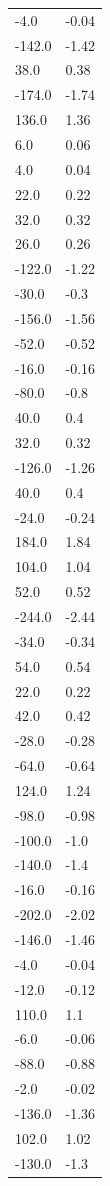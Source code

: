\begin{longtable}{ll}
-4.0 & -0.04 \\
-142.0 & -1.42 \\
38.0 & 0.38 \\
-174.0 & -1.74 \\
136.0 & 1.36 \\
6.0 & 0.06 \\
4.0 & 0.04 \\
22.0 & 0.22 \\
32.0 & 0.32 \\
26.0 & 0.26 \\
-122.0 & -1.22 \\
-30.0 & -0.3 \\
-156.0 & -1.56 \\
-52.0 & -0.52 \\
-16.0 & -0.16 \\
-80.0 & -0.8 \\
40.0 & 0.4 \\
32.0 & 0.32 \\
-126.0 & -1.26 \\
40.0 & 0.4 \\
-24.0 & -0.24 \\
184.0 & 1.84 \\
104.0 & 1.04 \\
52.0 & 0.52 \\
-244.0 & -2.44 \\
-34.0 & -0.34 \\
54.0 & 0.54 \\
22.0 & 0.22 \\
42.0 & 0.42 \\
-28.0 & -0.28 \\
-64.0 & -0.64 \\
124.0 & 1.24 \\
-98.0 & -0.98 \\
-100.0 & -1.0 \\
-140.0 & -1.4 \\
-16.0 & -0.16 \\
-202.0 & -2.02 \\
-146.0 & -1.46 \\
-4.0 & -0.04 \\
-12.0 & -0.12 \\
110.0 & 1.1 \\
-6.0 & -0.06 \\
-88.0 & -0.88 \\
-2.0 & -0.02 \\
-136.0 & -1.36 \\
102.0 & 1.02 \\
-130.0 & -1.3 \\

\end{longtable}
